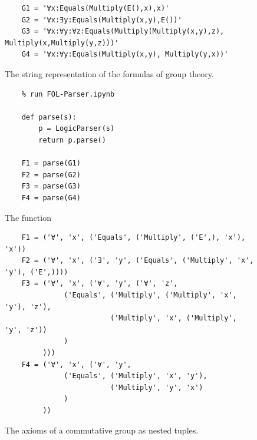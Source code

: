 \begin{figure}[!ht]
\centering
\begin{verbatim}
    G1 = '∀x:Equals(Multiply(E(),x),x)'                  
    G2 = '∀x:∃y:Equals(Multiply(x,y),E())'
    G3 = '∀x:∀y:∀z:Equals(Multiply(Multiply(x,y),z), Multiply(x,Multiply(y,z)))'
    G4 = '∀x:∀y:Equals(Multiply(x,y), Multiply(y,x))'
\end{verbatim}
\vspace*{-0.3cm}
\caption{The string representation of the formulas of group theory.}
\label{fig:group-theory}
\end{figure}

\begin{figure}[!ht]
\centering
\begin{verbatim}
    % run FOL-Parser.ipynb
               
    def parse(s):
        p = LogicParser(s)
        return p.parse()    

    F1 = parse(G1)
    F2 = parse(G2)
    F3 = parse(G3)
    F4 = parse(G4)
\end{verbatim}
\vspace*{-0.3cm}
\caption{The function  }
\label{fig:fol-parse.py}
\end{figure}

\begin{figure}[!ht]
\centering
\begin{verbatim}
    F1 = ('∀', 'x', ('Equals', ('Multiply', ('E',), 'x'), 'x'))
    F2 = ('∀', 'x', ('∃', 'y', ('Equals', ('Multiply', 'x', 'y'), ('E',))))
    F3 = ('∀', 'x', ('∀', 'y', ('∀', 'z',
              ('Equals', ('Multiply', ('Multiply', 'x', 'y'), 'z'),
                         ('Multiply', 'x', ('Multiply', 'y', 'z'))
              )
         )))
    F4 = ('∀', 'x', ('∀', 'y',
              ('Equals', ('Multiply', 'x', 'y'),
                         ('Multiply', 'y', 'x')
              )
         ))        
\end{verbatim}
\vspace*{-0.3cm}
\caption{The axioms of a commutative group as nested tuples.}
\label{fig:group-theory-tupel}
\end{figure}


